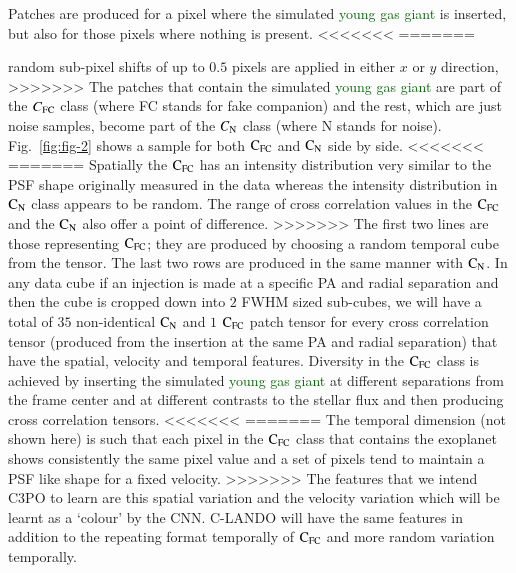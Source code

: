 \documentclass{aa}
\newcommand{\newchange}[1]{\textcolor{darkgreen}{#1}}
\begin{document}
{{{Patches are produced for a pixel where the simulated \newchange{young gas giant} is inserted, but also for those pixels where nothing is present.
<<<<<<<
=======
    \item random sub-pixel shifts of up to $0.5$ pixels are applied in either $x$ or $y$ direction,
>>>>>>>
The patches that contain the simulated \newchange{young gas giant} are part of the $C_{\rm{FC}}$ class (where FC stands for fake companion) and the rest, which are just noise samples, become part of the $C_{\rm{N}}$ class (where N stands for noise).
Fig.~\ref{fig:fig-2} shows a sample for both $\rm{C_{FC}}$ and $\rm{C_N}$ side by side.
<<<<<<<
=======
Spatially the $\rm{C_{FC}}$ has an intensity distribution very similar to the PSF shape originally measured in the data whereas the intensity distribution in $\rm{C_N}$ class appears to be random.
The range of cross correlation values in the $\rm{C_{FC}}$ and the $\rm{C_N}$ also offer a point of difference.
>>>>>>>
The first two lines are those representing $\rm{C_{FC}}$; they are produced by choosing a random temporal cube from the tensor.
The last two rows are produced in the same manner with $\rm{C_N}$.
In any data cube if an injection is made at a specific PA and radial separation and then the cube is cropped down into $2$ FWHM sized sub-cubes, we will have a total of $35$ non-identical $\rm{C_N}$ and $1$ $\rm{C_{FC}}$ patch tensor for every cross correlation tensor (produced from the insertion at the same PA and radial separation) that have the spatial, velocity and temporal features. 
Diversity in the $\rm{C_{FC}}$ class is achieved by inserting the simulated \newchange{young gas giant} at different separations from the frame center and at different contrasts to the stellar flux and then producing cross correlation tensors.
<<<<<<<
=======
The temporal dimension (not shown here) is such that each pixel in the $\rm{C_{FC}}$ class that contains the exoplanet shows consistently the same pixel value and a set of pixels tend to maintain a PSF like shape for a fixed velocity. 
>>>>>>>
The features that we intend C3PO to learn are this spatial variation and the velocity variation which will be learnt as a ‘colour’ by the CNN. 
C-LANDO will have the same features in addition to the repeating format temporally of $\rm{C_{FC}}$ and more random variation temporally.

}}}
\end{document}
